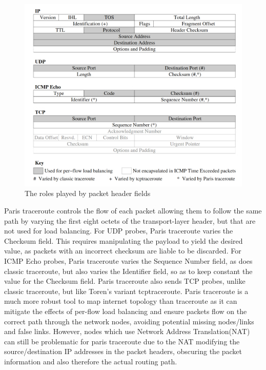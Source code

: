 \begin{figure}[!ht]
  \begin{center}
    \includegraphics[scale=0.3]{images/packet_header.png}
    \caption{The roles played by packet header fields \cite{anomalies}}
    \label{figure:packet_header_fig}
  \end{center}
\end{figure}

Paris traceroute controls the flow of each packet allowing them to follow the same path by varying the first eight octets of the transport-layer header, but that are not used for load balancing. For UDP probes, Paris traceroute varies the Checksum field. This requires manipulating the payload to yield the desired value, as packets with an incorrect checksum are liable to be discarded. For ICMP Echo probes, Paris traceroute varies the Sequence Number field, as does classic traceroute, but also varies the Identifier field, so as to keep constant the value for the Checksum
field. Paris traceroute also sends TCP probes, unlike classic traceroute, but like Toren’s variant tcptraceroute. \cite{anomalies}\cite{tcptraceroute}
Paris traceroute is a much more robust tool to map internet topology than traceroute as it can mitigate the effects of per-flow load balancing and ensure packets flow on the correct path through the network nodes, avoiding potential missing nodes/links and false links. However, nodes which use Network Address Translation(NAT) can still be problematic for paris traceroute due to the NAT modifying the source/destination IP addresses in the packet headers, obscuring the packet information and also therefore the actual routing path.

